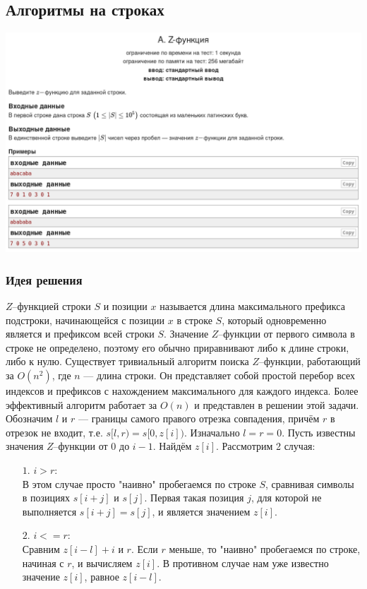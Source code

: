 \subsection*{Алгоритмы на строках}
\begin{center}
\includegraphics[width=\textwidth]{statements/20220709/A.png}
\end{center}
\subsubsection*{Идея решения}

$Z$--функцией строки $S$ и позиции $x$ называется длина максимального префикса подстроки, начинающейся с позиции $x$ в строке $S$, который одновременно является и префиксом всей строки $S$. Значение $Z$--функции от первого символа в строке не определено, поэтому его обычно приравнивают либо к длине строки, либо к нулю. Существует тривиальный алгоритм поиска $Z$--функции, работающий за $O(n^2)$, где $n$ --- длина строки. Он представляет собой простой перебор всех индексов и префиксов с нахождением максимального для каждого индекса. Более эффективный алгоритм работает за $O(n)$ и представлен в решении этой задачи. Обозначим $l$ и $r$ --- границы самого правого отрезка совпадения, причём $r$ в отрезок не входит, т.е. $s[l, r) = s[0, z[i])$. Изначально $l = r = 0$. Пусть известны значения $Z$--функции от $0$ до $i - 1$. Найдём $z[i]$. Рассмотрим 2 случая:
\begin{itemize}
 \setlength{\itemindent}{1em}
  \item[$1.$] $i > r$:\\
  В этом случае просто "наивно"{} пробегаемся по строке $S$, сравнивая символы в позициях $s[i + j]$ и $s[j]$. Первая такая позиция $j$, для которой не выполняется $s[i + j] = s[j]$, и является значением $z[i]$.
  \item[$2.$] $i <= r$:\\
  Сравним $z[i - l] + i$ и $r$. Если $r$ меньше, то "наивно"{} пробегаемся по строке, начиная с $r$, и вычисляем $z[i]$. В противном случае нам уже известно значение $z[i]$, равное $z[i - l]$.
\end{itemize}

